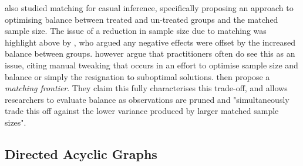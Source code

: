 {\cite{king2014balance} also studied matching for casual inference, specifically proposing an approach to optimising balance between treated and un-treated groups and the matched sample size. The issue of a reduction in sample size due to matching was highlight above by \cite{stuart2010matching}, who argued any negative effects were offset by the increased balance between groups. \cite{king2014balance} however argue that practitioners often do see this as an issue, citing manual tweaking that occurs in an effort to optimise sample size and balance or simply the resignation to suboptimal solutions. \cite{king2014balance} then propose a {\it matching frontier}. They claim this fully characterises this trade-off, and allows researchers to evaluate balance as observations are pruned and "simultaneously trade this off against the lower variance produced by larger matched sample sizes".
}

\subsection{Directed Acyclic Graphs}